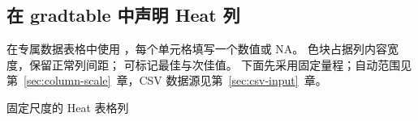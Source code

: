 \subsection{在 gradtable 中声明 Heat 列}
在专属数据表格中使用 ，每个单元格填写一个数值或 NA。
色块占据列内容宽度，保留正常列间距； 可标记最佳与次佳值。
下面先采用固定量程；自动范围见第~\ref{sec:column-scale}~章，CSV 数据源见第~\ref{sec:csv-input}~章。
\begin{example}[text and listing,sidebyside=false]{固定尺度的 Heat 表格列}
\begin{gradtable}[width=\linewidth,header align=c]
\end{gradtable}
\end{example}
